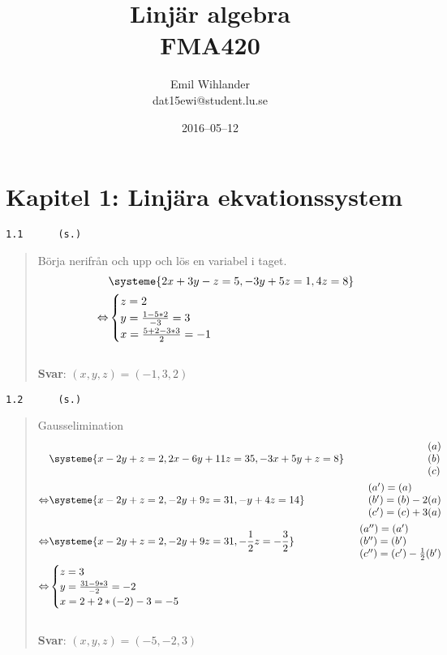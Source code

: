 \documentclass[a4paper]{article}
\title{Linjär algebra\\ FMA420}
\author{Emil Wihlander\\ dat15ewi@student.lu.se}
\date{2016--05--12}
\newcommand{\tskcol}[1]{\textcolor{tskcol}{#1}}
\begin{document}
 
\maketitle
\pagebreak
\section*{Kapitel 1: Linjära ekvationssystem}
\texttt{\tskcol{1.1~~~~~ (s.)}}
\begin{quotation}
	\noindent
	Börja nerifrån och upp och lös en variabel i taget.
	\begin{align*}
	&\systeme{
		2x+3y- z=5,
		  -3y+5z=1,
		      4z=8}  \\ \Leftrightarrow
	&\begin{cases}
	z=2 \\
	y=\frac{1-5*2}{-3}=3 \\
	x=\frac{5+2-3*3}{2}=-1
	\end{cases}
	\end{align*}
	\\
	\textbf{Svar}: $(x,y,z)=(-1,3,2)$
\end{quotation}

\texttt{\tskcol{1.2~~~~~ (s.)}}
\begin{quotation}
	\noindent
	Gausselimination
	\begin{align*}
	&\systeme{
		  x-2y+  z=2,
		 2x-6y+11z=35,
		-3x+5y+  z=8}  
	&\begin{array}{l} 
		(a) \\ 
		(b) \\
		(c)
	\end{array} \\ \Leftrightarrow
	&\systeme{
		x-2y+ z=2,
		 -2y+9z=31,
		 - y+4z=14}  
	&\begin{array}{l} 
	(a')=(a) \\ 
	(b')=(b)-2(a) \\
	(c')=(c)+3(a)
	\end{array} \\ \Leftrightarrow
	&\systeme{
		x-2y+   z=2,
		 -2y+  9z=31,
		    -\frac{1}{2}z=-\frac{3}{2}}  
	&\begin{array}{l} 
	(a'')=(a') \\ 
	(b'')=(b') \\
	(c'')=(c')-\frac{1}{2}(b')
	\end{array} \\ \Leftrightarrow
	&\begin{cases}
	z=3 \\
	y=\frac{31-9*3}{-2} =-2\\
	x=2+2*(-2)-3=-5
	\end{cases}
	\end{align*}
	\\
	\textbf{Svar}: $(x,y,z)=(-5,-2,3)$
\end{quotation}
\end{document}
